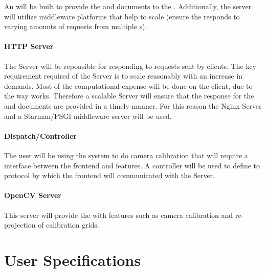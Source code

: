 \documentclass[11pt]{report}
\begin{document}
An  will be built to provide the  and  documents to the . Additionally, the server will utilize middleware platforms that help to scale (ensure the  responds to varying amounts of requests from multiple s).

\subsubsection{HTTP Server}


The  Server will be reponsible for responding to requests sent by  clients. The key requirement required of the  Server is to scale reasonably with an increase in demands. Most of the computational expense will be done on the  client, due to the way  works. Therefore a scalable  Server will ensure that the response for the  and  documents are provided in a timely manner. For this reason the Nginx  Server and a Starman/PSGI middleware server will be used.

\subsubsection{Dispatch/Controller}


The user will be using the system to do camera calibration that will require a interface between the frontend and  features. A controller will be used to define to protocol by which the frontend will communicated with the  Server. 

\subsubsection{OpenCV Server}

This server will provide the  with  features such as camera calibration and re-projection of calibration grids.

\chapter{User Specifications}
\end{document}
